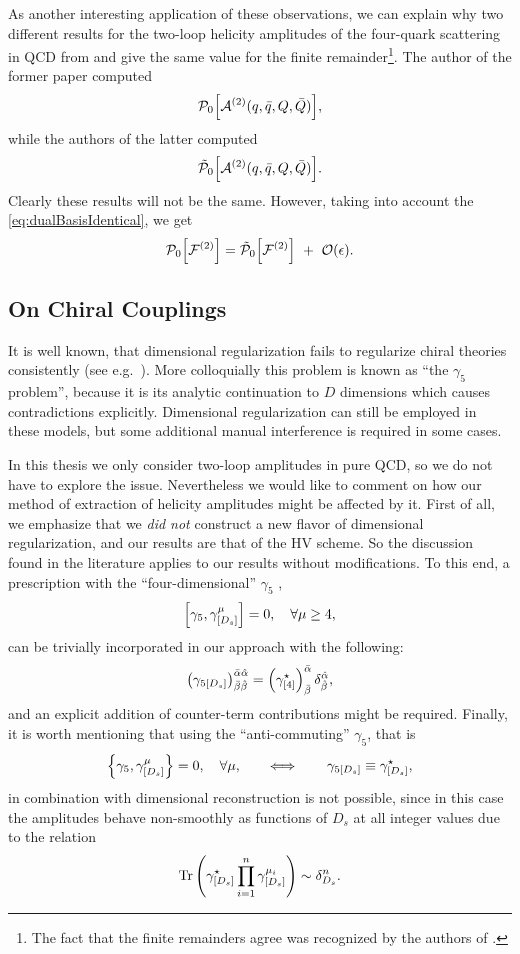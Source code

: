 As another interesting application of these observations, we can explain why 
two different results for the two-loop helicity amplitudes of the four-quark scattering in QCD
from \cite{Glover:2004si} and \cite{DeFreitas:2004kmi} give the same
value for the finite remainder\footnote{The fact that the finite remainders agree was recognized by the authors of \cite{DeFreitas:2004kmi}.}.
The author of the former paper computed 
\[
  \mathcal{P}_0\qty[\mathcal{A}^{(2)}(q,\bar{q},Q,\bar{Q})],
\]
while the authors of the latter computed
\[
  \tilde{\mathcal{P}}_0\qty[\mathcal{A}^{(2)}(q,\bar{q},Q,\bar{Q})].
\]
Clearly these results will not be the same. 
However, taking into account the \cref{eq:dualBasisIdentical}, we get
\[
  \mathcal{P}_0\qty[\mathcal{F}^{(2)}] = \tilde{\mathcal{P}}_0\qty[\mathcal{F}^{(2)}] ~+~ \order{\epsilon}.
\]

\subsection{On Chiral Couplings}

It is well known, that dimensional regularization fails to regularize chiral theories consistently
(see e.g.\ \cite{Larin:1993tq,Boughezal:2019xpp,Jegerlehner:2000dz,Bonneau:1980yb,Bruque:2018bmy,Baikov:1991qz,Kreimer:1989ke}).
More colloquially this problem is known as ``the $\gamma_5$ problem'', because it is its analytic
continuation to $D$ dimensions which causes contradictions explicitly.
Dimensional regularization can still be employed in these models, 
but some additional manual interference is required in some cases. 

In this thesis we only consider two-loop amplitudes in pure QCD, so we do not have to explore the issue. 
Nevertheless we would like to comment on how our method of extraction of helicity amplitudes might be affected by it.
First of all, we emphasize that we \emph{did not} construct a new flavor of dimensional regularization,
and our results are that of the HV scheme.  So the discussion found in the literature applies to our results without modifications.
To this end, a prescription with  the ``four-dimensional'' $\gamma_5$ \cite{tHooft:1972tcz,Breitenlohner:1977hr,Larin:1993tq},
\[\commutator{\gamma_{5}}{\gamma^{\mu}_{[D_s]}}=0, \quad \forall \mu\geq 4,\]
can be trivially incorporated in our approach with the following:
\[
  \qty(\gamma_{5[D_s]})^{\bar{\alpha}\hat{\alpha}}_{\bar{\beta}\hat{\beta}} = \qty(\gamma^\star_{[4]})^{\bar{\alpha}}_{\bar{\beta}}\,\delta^{\hat{\alpha}}_{\hat{\beta}},
\]
and an explicit addition of counter-term contributions might be required.
Finally, it is worth mentioning that using the ``anti-commuting'' $\gamma_5$, that is
\[
  \anticommutator{\gamma_{5}}{\gamma^{\mu}_{[D_s]}}=0, \quad \forall \mu, \qquad\Longleftrightarrow\qquad \gamma_{5[D_s]} \equiv \gamma^\star_{[D_s]},
\]
in combination with dimensional reconstruction is not possible, since
in this case the amplitudes behave non-smoothly as functions of $D_s$ at all integer values due to the relation
\begin{equation}
  \Tr\qty(\gamma^\star_{[D_s]} \prod_{i=1}^{n} \gamma^{\mu_i}_{[D_s]}) \sim \delta^n_{D_s}.
\end{equation}


